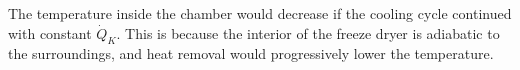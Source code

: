 The temperature inside the chamber would decrease if the cooling cycle continued with constant \( \dot{Q}_K \). This is because the interior of the freeze dryer is adiabatic to the surroundings, and heat removal would progressively lower the temperature.